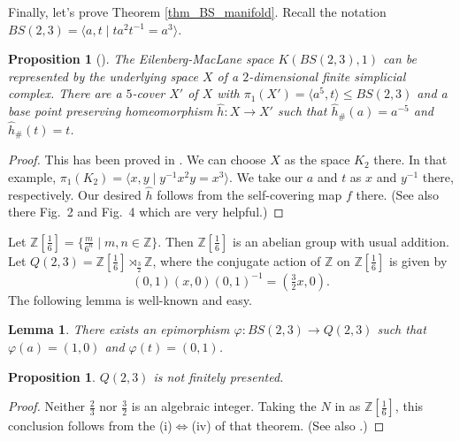 \documentclass[12pt]{amsart}
\theoremstyle{plain}
\newtheorem{proposition}[theorem]{Proposition}
\newtheorem{lemma}[theorem]{Lemma}
\theoremstyle{definition}
\theoremstyle{question}
\theoremstyle{remark}
\theoremstyle{assumption}
\numberwithin{equation}{section}
\theoremstyle{bigthm}
\begin{document}
Finally, let's prove Theorem \ref{thm_BS_manifold}. Recall the notation $BS(2,3) = \langle a,t \mid t a^{2} t^{-1} = a^{3} \rangle$.
\begin{proposition}[\cite{BDT}]\label{prop_BS_space}
The Eilenberg-MacLane space $K(BS(2,3), 1)$ can be represented by the underlying space $X$ of a $2$-dimensional finite simplicial complex. There are a $5$-cover $X'$ of $X$ with $\pi_{1} (X') = \langle a^{5}, t \rangle \le BS(2,3)$ and a base point preserving homeomorphism $\hat{h} \colon  X \rightarrow X'$ such that $\hat{h}_{\#} (a) = a^{-5}$ and $\hat{h}_{\#} (t) = t$.
\end{proposition}
\begin{proof}
This has been proved in \cite[Example~2.3]{BDT}. We can choose $X$ as the space $K_{2}$ there. In that example, $\pi_{1} (K_{2}) = \langle x,y \mid y^{-1} x^{2} y = x^{3} \rangle$. We take our $a$ and $t$ as $x$ and $y^{-1}$ there, respectively. Our desired $\hat{h}$ follows from the self-covering map $f$ there. (See also there Fig.~2 and Fig.~4 which are very helpful.)
\end{proof}

Let $\mathbb{Z}[\frac{1}{6}] = \{ \frac{m}{6^{n}} \mid m,n \in \mathbb{Z} \}$. Then $\mathbb{Z}[\frac{1}{6}]$ is an abelian group with usual addition. Let $Q(2,3) = \mathbb{Z}[\frac{1}{6}] \rtimes_{\frac{3}{2}} \mathbb{Z}$, where the conjugate action of $\mathbb{Z}$ on $\mathbb{Z}[\frac{1}{6}]$ is given by
\[
(0,1) (x,0) (0,1)^{-1} = (\tfrac{3}{2} x,0).
\]
The following lemma is well-known and easy.

\begin{lemma}\label{lem_BS_quotient}
There exists an epimorphism $\varphi \colon  BS(2,3) \rightarrow Q(2,3)$ such that $\varphi (a) = (1,0)$ and $\varphi (t) = (0,1)$.
\end{lemma}

\begin{proposition}\label{prop_Q(2,3)_present}
$Q(2,3)$ is not finitely presented.
\end{proposition}
\begin{proof}
Neither $\tfrac{2}{3}$ nor $\tfrac{3}{2}$ is an algebraic integer. Taking the $N$ in \cite[Theorem~C]{Bieri_Strebel} as $\mathbb{Z}[\frac{1}{6}]$, this conclusion follows from the (i)$\Leftrightarrow$(iv) of that theorem. (See also \cite[Lemma~11]{Groves}.)
\end{proof}
\end{document}
